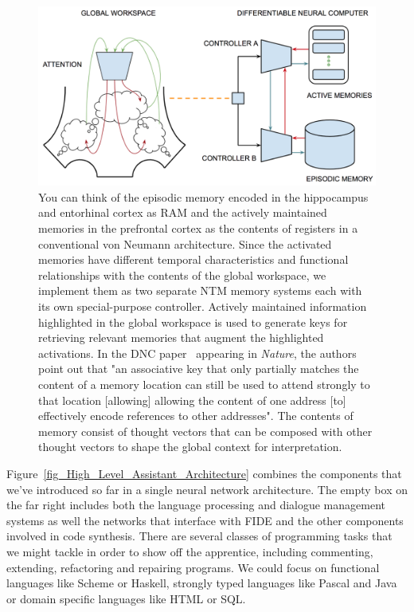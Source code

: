 \begin{figure}
%
  \begin{center} 
    \includegraphics[width=400pt]{./figures/Global_Workspace_Episodic_Memory.png} %
  \end{center}
%
  \caption{You can think of the episodic memory encoded in the hippocampus and entorhinal cortex as RAM and the actively maintained memories in the prefrontal cortex as the contents of registers in a conventional von Neumann architecture. Since the activated memories have different temporal characteristics and functional relationships with the contents of the global workspace, we implement them as two separate NTM memory systems each with its own special-purpose controller. Actively maintained information highlighted in the global workspace is used to generate keys for retrieving relevant memories that augment the highlighted activations. In the DNC paper~\cite{GravesetalNATURE-16} appearing in {\it{Nature}}, the authors point out that "an associative key that only partially matches the content of a memory location can still be used to attend strongly to that location [allowing] allowing the content of one address [to] effectively encode references to other addresses". The contents of memory consist of thought vectors that can be composed with other thought vectors to shape the global context for interpretation.}
%
  \label{fig_Global_Workspace_Episodic_Memory}
%  
\end{figure}


Figure~\ref{fig_High_Level_Assistant_Architecture} combines the components that we've introduced so far in a single neural network architecture. The empty box on the far right includes both the language processing and dialogue management systems as well the networks that interface with FIDE and the other components involved in code synthesis. There are several classes of programming tasks that we might tackle in order to show off the apprentice, including commenting, extending, refactoring and repairing programs. We could focus on functional languages like Scheme or Haskell, strongly typed languages like Pascal and Java or domain specific languages like HTML or SQL. 

